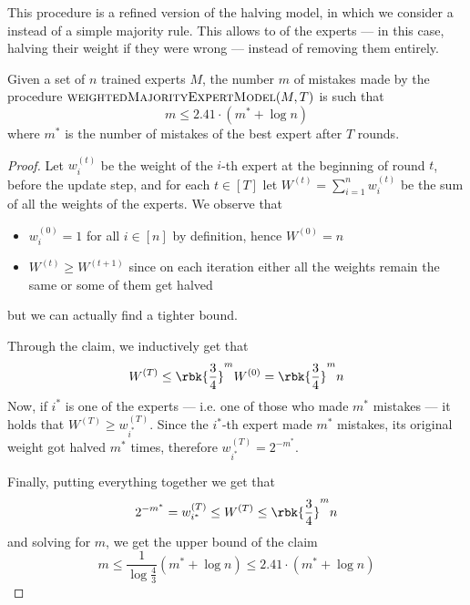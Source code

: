 \documentclass[a4paper, 12pt]{report}
\begin{document}
    This procedure is a refined version of the halving model, in which we consider a  instead of a simple majority rule. This allows to  of the experts --- in this case, halving their weight if they were wrong --- instead of removing them entirely.

    \begin{framedthm}[label={wmem proof}]{}
        Given a set of $n$ trained experts $M$, the number $m$ of mistakes made by the procedure $\textsc{weightedMajorityExpertModel}(M, T)$ is such that $$m \le 2.41 \cdot (m^* + \log n)$$ where $m^*$ is the number of mistakes of the best expert after $T$ rounds.
    \end{framedthm}

    \begin{proof}
        Let $w^{(t)}_i$ be the weight of the $i$-th expert at the beginning of round $t$, before the update step, and for each $t \in [T]$ let $W^{(t)} = \sum_{i = 1}^{n}{w_i^{(t)}}$ be the sum of all the weights of the experts. We observe that
        
        \begin{itemize}
            \item $w_i^{(0)} = 1$ for all $i \in [n]$ by definition, hence $W^{(0)} = n$
            \item $W^{(t)} \ge W^{(t + 1)}$ since on each iteration either all the weights remain the same or some of them get halved
        \end{itemize}

        but we can actually find a tighter bound.


        Through the claim, we inductively get that $$W^{(T)} \le \rbk{\dfrac{3}{4}}^m W^{(0)} = \rbk{\dfrac{3}{4}}^m n$$ Now, if $i^*$ is one of the  experts --- i.e. one of those who made $m^*$ mistakes --- it holds that $W^{(T)} \ge w_{i^*}^{(T)}$. Since the $i^*$-th expert made $m^*$ mistakes, its original weight got halved $m^*$ times, therefore $w_{i^*}^{(T)} = 2^{-m^*}$.

        Finally, putting everything together we get that $$2^{-m^*} = w_{i^*}^{(T)} \le W^{(T)} \le \rbk{\dfrac{3}{4}}^m n$$ and solving for $m$, we get the upper bound of the claim $$m \le \dfrac{1}{\log \tfrac{4}{3}} (m^* + \log n) \le 2.41 \cdot (m^* + \log n)$$
    \end{proof}
\end{document}
